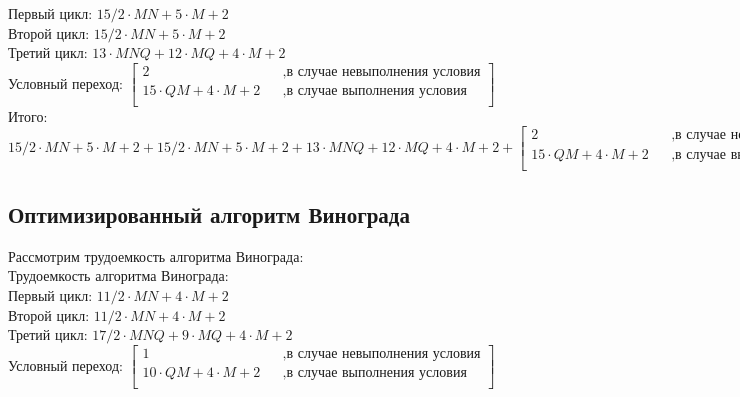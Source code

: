 \documentclass[12pt]{report}
\begin{document}
Первый цикл: $15/2 \cdot M  N + 5 \cdot M + 2$ \\

Второй цикл: $15/2 \cdot M  N + 5 \cdot M + 2$\\

Третий цикл: $13 \cdot M  N Q + 12 \cdot M Q + 4 \cdot M + 2$\\

Условный переход: $\begin{bmatrix}
             2    &&, \text{в случае невыполнения условия}\\
             15 \cdot QM + 4 \cdot M + 2 &&, \text{в случае выполнения условия}\\
           \end{bmatrix} $ \\

Итого: $15/2 \cdot M  N + 5 \cdot M + 2 + 15/2 \cdot M  N + 5 \cdot M + 2 + 13 \cdot M  N Q + 12 \cdot M Q + 4 \cdot M + 2 +
       \begin{bmatrix}
             2    &&, \text{в случае невыполнения условия}\\
             15 \cdot QM + 4 \cdot M + 2 &&, \text{в случае выполнения условия}\\
           \end{bmatrix} $ \\

\subsection{Оптимизированный алгоритм Винограда}

Рассмотрим трудоемкость алгоритма Винограда:\\

Трудоемкость алгоритма Винограда:\\

Первый цикл: $11/2 \cdot M  N + 4 \cdot M + 2$ \\

Второй цикл: $11/2 \cdot M  N + 4 \cdot M + 2$\\

Третий цикл: $17/2 \cdot M  N Q + 9 \cdot M Q + 4 \cdot M + 2$\\

Условный переход: $\begin{bmatrix}
             1    &&, \text{в случае невыполнения условия}\\
             10 \cdot QM + 4 \cdot M + 2 &&, \text{в случае выполнения условия}\\
           \end{bmatrix} $ \\
\end{document}
